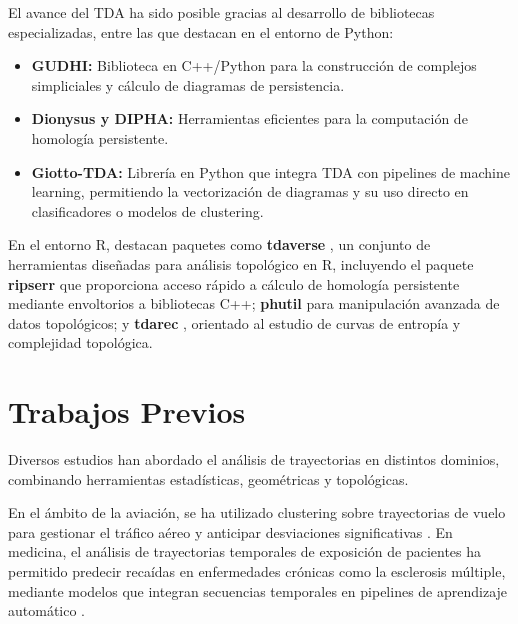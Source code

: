 El avance del TDA ha sido posible gracias al desarrollo de bibliotecas especializadas, entre las que destacan en el entorno de Python:

\begin{itemize}
    \item \textbf{GUDHI:} Biblioteca en C++/Python para la construcción de complejos simpliciales y cálculo de diagramas de persistencia. \cite{gudhi}
    \item \textbf{Dionysus y DIPHA:} Herramientas eficientes para la computación de homología persistente. \cite{DIPHA}
    \item \textbf{Giotto-TDA:} Librería en Python que integra TDA con pipelines de machine learning, permitiendo la vectorización de diagramas y su uso directo en clasificadores o modelos de clustering. \cite{chazal2021introduction} \cite{Giotto-tda}
\end{itemize}

En el entorno R, destacan paquetes como \textbf{tdaverse} \cite{tdaverse}, un conjunto de herramientas diseñadas para análisis topológico en R, incluyendo el paquete \textbf{ripserr} \cite{ripserr} que proporciona acceso rápido a cálculo de homología persistente mediante envoltorios a bibliotecas C++; \textbf{phutil} \cite{phutil} para manipulación avanzada de datos topológicos; y \textbf{tdarec} \cite{tdarec}, orientado al estudio de curvas de entropía y complejidad topológica.


\vspace{2cm}
\section{Trabajos Previos}

Diversos estudios han abordado el análisis de trayectorias en distintos dominios, combinando herramientas estadísticas, geométricas y topológicas.

\vspace{0.2cm}

En el ámbito de la aviación, se ha utilizado clustering sobre trayectorias de vuelo para gestionar el tráfico aéreo y anticipar desviaciones significativas \cite{airtraffic2025}. En medicina, el análisis de trayectorias temporales de exposición de pacientes ha permitido predecir recaídas en enfermedades crónicas como la esclerosis múltiple, mediante modelos que integran secuencias temporales en pipelines de aprendizaje automático \cite{bosoni2024predicting}.

